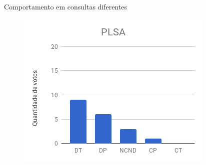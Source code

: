 \documentclass[xcolor=table]{beamer}
\begin{document}
\begin{frame}{Comportamento em consultas diferentes}
\begin{figure}[!h]
		\includegraphics[width=.31\textwidth]{images/figuras-experimento/C2-Q1-PLSA.png}

	

\end{figure}


\end{frame}
\end{document}
